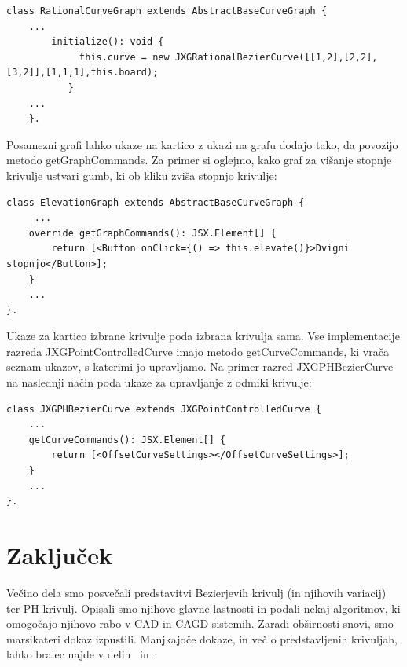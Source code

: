 \documentclass[isrm2, tisk]{fmfdelo}
\begin{document}
    \begin{lstlisting}[label={lst:ghdfg}]
    class RationalCurveGraph extends AbstractBaseCurveGraph {
    ...
        initialize(): void {
             this.curve = new JXGRationalBezierCurve([[1,2],[2,2],[3,2]],[1,1,1],this.board);
           }
    ...
    }.
    \end{lstlisting}
    Posamezni grafi lahko ukaze na kartico z ukazi na grafu dodajo tako, da povozijo metodo getGraphCommands.
    Za primer si oglejmo, kako graf za višanje stopnje krivulje ustvari gumb, ki ob kliku zviša stopnjo krivulje:
    \begin{lstlisting}[label={lst:ghdfssg}]
 class ElevationGraph extends AbstractBaseCurveGraph {
     ...
    override getGraphCommands(): JSX.Element[] {
        return [<Button onClick={() => this.elevate()}>Dvigni stopnjo</Button>];
    }
    ...
}.
    \end{lstlisting}
    Ukaze za kartico izbrane krivulje poda izbrana krivulja sama.
    Vse implementacije razreda JXGPointControlledCurve imajo metodo getCurveCommands, ki vrača seznam ukazov, s katerimi jo upravljamo.
    Na primer razred JXGPHBezierCurve na naslednji način poda ukaze za upravljanje z odmiki krivulje:
    \begin{lstlisting}[label={lst:ghdfs1sg}]
class JXGPHBezierCurve extends JXGPointControlledCurve {
    ...
    getCurveCommands(): JSX.Element[] {
        return [<OffsetCurveSettings></OffsetCurveSettings>];
    }
    ...
}.
    \end{lstlisting}


    \section{Zaključek}
    Večino dela smo posvečali predstavitvi Bezierjevih krivulj (in njihovih variacij) ter PH krivulj.
    Opisali smo njihove glavne lastnosti in podali nekaj algoritmov, ki omogočajo njihovo rabo v CAD in CAGD sistemih.
    Zaradi obširnosti snovi, smo marsikateri dokaz izpustili.
    Manjkajoče dokaze, in več o predstavljenih krivuljah, lahko bralec najde v delih~\cite{farouki} in~\cite{stability-rational}.
\end{document}
